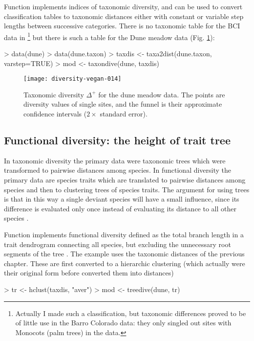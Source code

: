 \documentclass[a4paper,10pt,twocolumn]{article}
\begin{document}
Function  implements indices of taxonomic diversity,
and  can be used to convert classification tables to
taxonomic distances either with constant or variable step lengths
between successive categories. There is no taxonomic table for the BCI
data in \footnote{Actually I made such a classification,
  but taxonomic differences proved to be of little use in the Barro
  Colorado data: they only singled out sites with Monocots (palm
  trees) in the data.}
but there is such a table for the Dune meadow data (Fig. \ref{fig:taxondive}):
\begin{Schunk}
\begin{Sinput}
> data(dune)
> data(dune.taxon)
> taxdis <- taxa2dist(dune.taxon, varstep=TRUE)
> mod <- taxondive(dune, taxdis)
\end{Sinput}
\end{Schunk}
\begin{figure}
\texttt{[image: diversity-vegan-014]}
\caption{Taxonomic diversity $\Delta^+$ for the dune meadow data. The
  points are diversity values of single sites, and the funnel is their
  approximate confidence intervals ($2 \times$ standard error).}
\label{fig:taxondive}
\end{figure}

\subsection{Functional diversity: the height of trait tree}

In taxonomic diversity the primary data were taxonomic trees which
were transformed to pairwise distances among species. In functional
diversity the primary data are species traits which are translated to
pairwise distances among species and then to clustering trees of
species traits. The argument for using trees is that in this way a
single deviant species will have a small influence, since its
difference is evaluated only once instead of evaluating its distance
to all other species \citep{PetcheyGaston06}.

Function  implements functional diversity defined as
the total branch length in a trait dendrogram connecting all species,
but excluding the unnecessary root segments of the tree
\citep{PetcheyGaston02, PetcheyGaston06}.  The example uses the
taxonomic distances of the previous chapter. These are first converted
to a hierarchic clustering (which actually were their original form
before  converted them into distances)
\begin{Schunk}
\begin{Sinput}
> tr <- hclust(taxdis, "aver")
> mod <- treedive(dune, tr)
\end{Sinput}
\end{Schunk}
\end{document}
